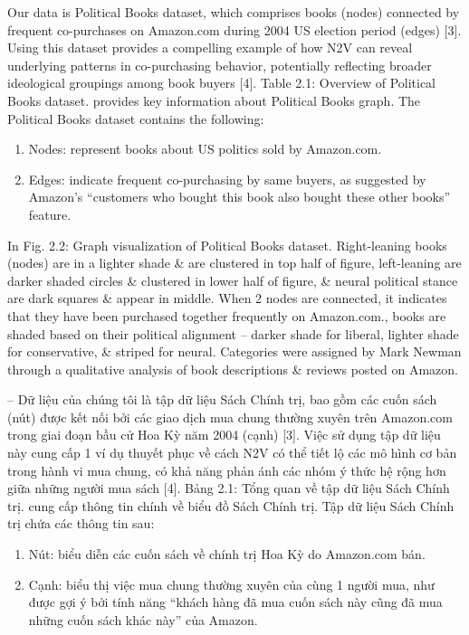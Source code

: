 \documentclass{article}
\begin{document}
\begin{itemize}
\begin{itemize}
\begin{enumerate}
        \end{enumerate}
        Our data is Political Books dataset, which comprises books (nodes) connected by frequent co-purchases on Amazon.com during 2004 US election period (edges) [3]. Using this dataset provides a compelling example of how N2V can reveal underlying patterns in co-purchasing behavior, potentially reflecting broader ideological groupings among book buyers [4]. {\sf Table 2.1: Overview of Political Books dataset.} provides key information about Political Books graph. The Political Books dataset contains the following:
        \begin{enumerate}
            \item Nodes: represent books about US politics sold by Amazon.com.
            \item Edges: indicate frequent co-purchasing by same buyers, as suggested by Amazon's ``customers who bought this book also bought these other books'' feature.
        \end{enumerate}
        In {\sf Fig. 2.2: Graph visualization of Political Books dataset. Right-leaning books (nodes) are in a lighter shade \& are clustered in top half of figure, left-leaning are darker shaded circles \& clustered in lower half of figure, \& neural political stance are dark squares \& appear in middle. When 2 nodes are connected, it indicates that they have been purchased together frequently on Amazon.com.}, books are shaded based on their political alignment -- darker shade for liberal, lighter shade for conservative, \& striped for neural. Categories were assigned by {\sc Mark Newman} through a qualitative analysis of book descriptions \& reviews posted on Amazon.

        -- Dữ liệu của chúng tôi là tập dữ liệu Sách Chính trị, bao gồm các cuốn sách (nút) được kết nối bởi các giao dịch mua chung thường xuyên trên Amazon.com trong giai đoạn bầu cử Hoa Kỳ năm 2004 (cạnh) [3]. Việc sử dụng tập dữ liệu này cung cấp 1 ví dụ thuyết phục về cách N2V có thể tiết lộ các mô hình cơ bản trong hành vi mua chung, có khả năng phản ánh các nhóm ý thức hệ rộng hơn giữa những người mua sách [4]. {\sf Bảng 2.1: Tổng quan về tập dữ liệu Sách Chính trị.} cung cấp thông tin chính về biểu đồ Sách Chính trị. Tập dữ liệu Sách Chính trị chứa các thông tin sau:

        \begin{enumerate}
            \item Nút: biểu diễn các cuốn sách về chính trị Hoa Kỳ do Amazon.com bán.
            \item Cạnh: biểu thị việc mua chung thường xuyên của cùng 1 người mua, như được gợi ý bởi tính năng ``khách hàng đã mua cuốn sách này cũng đã mua những cuốn sách khác này'' của Amazon.


\end{enumerate}
\end{itemize}
\end{itemize}
\end{document}

